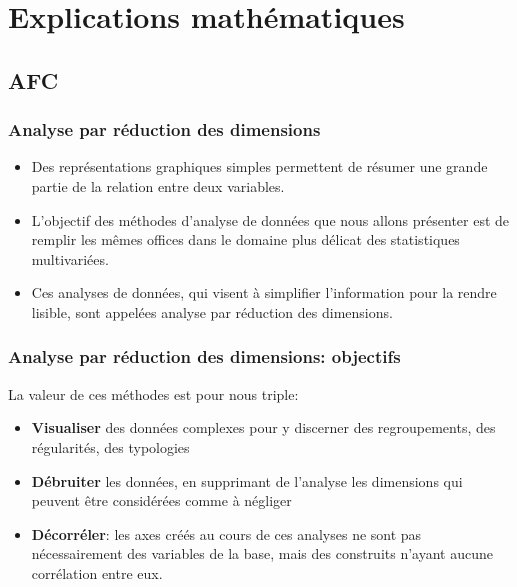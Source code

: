 \documentclass{beamer}
\begin{document}
\section{Explications mathématiques}
\subsection{AFC}



\begin{frame}[fragile]
\frametitle{Analyse par réduction des dimensions}

\begin{itemize}
	\item Des représentations graphiques simples permettent de résumer une grande partie de la relation entre deux variables.
	\item L'objectif des méthodes d'analyse de données que nous allons présenter est de remplir les mêmes offices dans le domaine plus délicat des statistiques multivariées.
	\item Ces analyses de données, qui visent à simplifier l'information pour la rendre lisible, sont appelées \alert{analyse par réduction des dimensions}.
\end{itemize}

\end{frame}

\begin{frame}[fragile]
\frametitle{Analyse par réduction des dimensions: objectifs}

La valeur de ces méthodes est pour nous triple:

\begin{itemize}
\item \textbf{Visualiser} des données complexes pour y discerner des regroupements, des régularités, des typologies
\item \textbf{Débruiter} les données, en supprimant de l'analyse les dimensions qui peuvent être considérées comme à négliger
\item \textbf{Décorréler}: les axes créés au cours de ces analyses ne sont pas nécessairement des variables de la base, mais des construits n'ayant aucune corrélation entre eux.
\end{itemize}

\end{frame}
\end{document}
